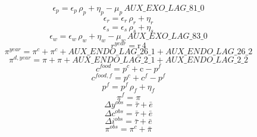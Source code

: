 \begin{dmath}
{{\epsilon_{p}}}={{\epsilon_{p}}}\, {{\rho_{p}}}+{{\eta_{p}}}-{{\mu_{p}}}\, {AUX\_EXO\_LAG\_81\_0}
\end{dmath}
\begin{dmath}
{{\epsilon_{r}}}={{\epsilon_{r}}}\, {{\rho_{r}}}+{{\eta_{r}}}
\end{dmath}
\begin{dmath}
{{\epsilon_{s}}}={{\epsilon_{s}}}\, {{\rho_{s}}}+{{\eta_{s}}}
\end{dmath}
\begin{dmath}
{{\epsilon_{w}}}={{\epsilon_{w}}}\, {{\rho_{w}}}+{{\eta_{w}}}-{{\mu_{w}}}\, {AUX\_EXO\_LAG\_83\_0}
\end{dmath}
\begin{dmath}
{{r^{year}}}={{\mathrm{r}}}\, 4
\end{dmath}
\begin{dmath}
{{\pi^{year}}}={{\pi^{c}}}+{{\pi^{c}}}+{AUX\_ENDO\_LAG\_26\_1}+{AUX\_ENDO\_LAG\_26\_2}
\end{dmath}
\begin{dmath}
{{\pi^{d,year}}}={{\pi}}+{{\pi}}+{AUX\_ENDO\_LAG\_2\_1}+{AUX\_ENDO\_LAG\_2\_2}
\end{dmath}
\begin{dmath}
{{c^{food}}}={{p^{c}}}+{{\mathrm{c}}}-{{p^{f}}}
\end{dmath}
\begin{dmath}
{{c^{food,f}}}={{p^{c}}}+{{c^{f}}}-{{p^{f}}}
\end{dmath}
\begin{dmath}
{{p^{f}}}={{p^{f}}}\, {{\rho_{f}}}+{{\eta_{f}}}
\end{dmath}
\begin{dmath}
{{\pi^{f}}}={{\pi}}
\end{dmath}
\begin{dmath}
{{\Delta y^{obs}}}={{\bar{\tau}}}+{{\bar{e}}}
\end{dmath}
\begin{dmath}
{{\Delta c^{obs}}}={{\bar{\tau}}}+{{\bar{e}}}
\end{dmath}
\begin{dmath}
{{\Delta i^{obs}}}={{\bar{\tau}}}+{{\bar{e}}}
\end{dmath}
\begin{dmath}
{{\pi^{obs}}}={{\pi^{c}}}+{{\bar{\pi}}}
\end{dmath}
